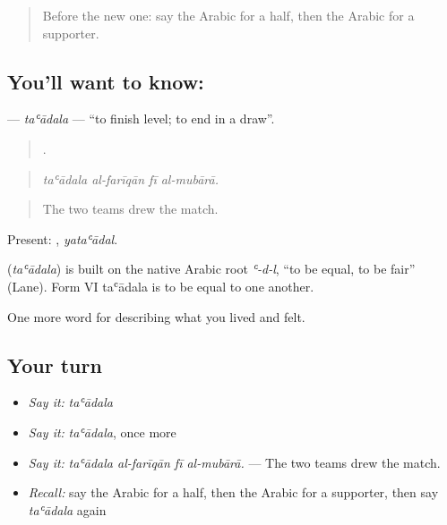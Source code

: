 \label{lesson:AR-C546-taadala}



\begin{quote}
Before the new one: say the Arabic for a half, then the Arabic for a supporter.
\end{quote}

\subsection*{You'll want to know: }
\textbf{} — \emph{taʿādala} — \textquotedblleft{}to finish level; to end in a draw\textquotedblright{}.

\begin{quote}
   .
\end{quote}

\begin{quote}
\emph{taʿādala al-farīqān fī al-mubārā.}
\end{quote}

\begin{quote}
The two teams drew the match.
\end{quote}

Present: , \emph{yataʿādal}.

\begin{cousinweb}
\textbf{} (\emph{taʿādala}) is built on the native Arabic root \emph{ʿ-d-l}, \textquotedblleft{}to be equal, to be fair\textquotedblright{} (Lane). Form VI taʿādala is to be equal to one another.
\end{cousinweb}

\begin{grammarlens}[title={What you've built}]
One more word for describing what you lived and felt.
\end{grammarlens}

\subsection*{Your turn}
\begin{itemize}
\raggedright
  \item \emph{Say it:} \emph{taʿādala}
  \item \emph{Say it:} \emph{taʿādala}, once more
  \item \emph{Say it:} \emph{taʿādala al-farīqān fī al-mubārā.} — The two teams drew the match.
  \item \emph{Recall:} say the Arabic for a half, then the Arabic for a supporter, then say \emph{taʿādala} again
\end{itemize}


